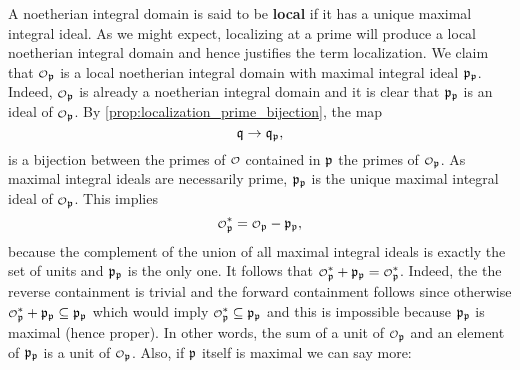     A noetherian integral domain is said to be \textbf{local} if it has a unique maximal integral ideal. As we might expect, localizing at a prime will produce a local noetherian integral domain and hence justifies the term localization. We claim that $\smc{O}_{\mf{p}}$ is a local noetherian integral domain with maximal integral ideal $\mathfrak{p}_{\mathfrak{p}}$. Indeed, $\smc{O}_{\mf{p}}$ is already a noetherian integral domain and it is clear that $\mathfrak{p}_{\mathfrak{p}}$ is an ideal of $\smc{O}_{\mf{p}}$. By \cref{prop:localization_prime_bijection}, the map
    \[
      \mathfrak{q} \to \mathfrak{q}_{\mathfrak{p}},
    \]
    is a bijection between the primes of $\smc{O}$ contained in $\mathfrak{p}$ the primes of $\smc{O}_{\mf{p}}$. As maximal integral ideals are necessarily prime, $\mathfrak{p}_{\mathfrak{p}}$ is the unique maximal integral ideal of $\smc{O}_{\mf{p}}$. This implies
    \[
      \smc{O}_{\mf{p}}^{\ast} = \smc{O}_{\mf{p}}-\mf{p}_{\mf{p}},
    \]
    because the complement of the union of all maximal integral ideals is exactly the set of units and $\mathfrak{p}_{\mathfrak{p}}$ is the only one. It follows that $\smc{O}_{\mf{p}}^{\ast}+\mf{p}_{\mf{p}} = \smc{O}_{\mf{p}}^{\ast}$. Indeed, the the reverse containment is trivial and the forward containment follows since otherwise $\smc{O}_{\mf{p}}^{\ast}+\mf{p}_{\mf{p}} \subseteq \mf{p}_{\mf{p}}$ which would imply $\smc{O}_{\mf{p}}^{\ast} \subseteq \mf{p}_{\mf{p}}$ and this is impossible because $\mathfrak{p}_{\mathfrak{p}}$ is maximal (hence proper). In other words, the sum of a unit of $\smc{O}_{\mf{p}}$ and an element of $\mathfrak{p}_{\mathfrak{p}}$ is a unit of $\smc{O}_{\mf{p}}$. Also, if $\mathfrak{p}$ itself is maximal we can say more:

